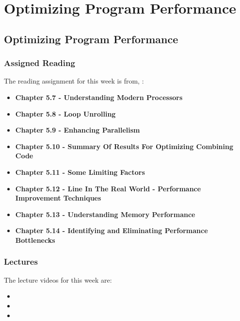 \clearpage

\renewcommand{\ChapTitle}{Optimizing Program Performance}
\renewcommand{\SectionTitle}{Optimizing Program Performance}

\chapter{\ChapTitle}
\section{\SectionTitle}

\subsection{Assigned Reading}

The reading assignment for this week is from, \Textbook:

\begin{itemize}
    \item \textbf{Chapter 5.7 - Understanding Modern Processors}
    \item \textbf{Chapter 5.8 - Loop Unrolling}
    \item \textbf{Chapter 5.9 - Enhancing Parallelism}
    \item \textbf{Chapter 5.10 - Summary Of Results For Optimizing Combining Code}
    \item \textbf{Chapter 5.11 - Some Limiting Factors}
    \item \textbf{Chapter 5.12 - Line In The Real World - Performance Improvement Techniques}
    \item \textbf{Chapter 5.13 - Understanding Memory Performance}
    \item \textbf{Chapter 5.14 - Identifying and Eliminating Performance Bottlenecks}
\end{itemize}

\subsection{Lectures}

The lecture videos for this week are:

\begin{itemize}
    \item {}
    \item {}
    \item {}
\end{itemize}

